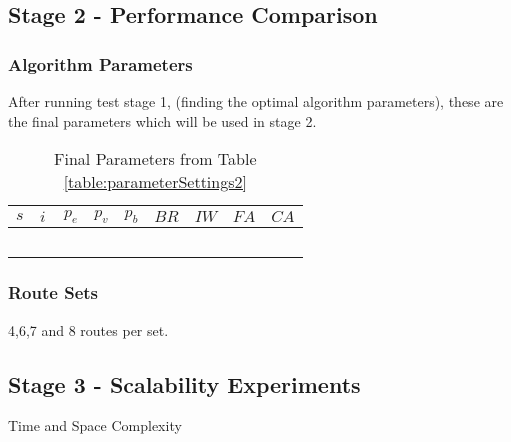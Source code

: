 \subsection{Stage 2 - Performance Comparison}

\subsubsection{Algorithm Parameters}
After running test stage 1, (finding the optimal algorithm parameters), these are the final parameters which will be used in stage 2.

\begin{table}[H]
	\centering
    \begin{tabular}{|l|l|l|l|l|l|l|l|l|}
 	\hline
 	$s$ & $i$ & $p_{e}$ & $p_{v}$ & $p_{b}$ & $BR$  & $IW$ & $FA$ & $CA$  \\
 	\hline
    ~ & ~ & ~ & ~ & ~ & ~ & ~ & ~  & ~  \\
	\hline
    \end{tabular}
    \caption {Final Parameters from Table \ref{table:parameterSettings2}}
    \label{table:finalParameters}
	\end{table}

\subsubsection{Route Sets}
4,6,7 and 8 routes per set.

\subsection{Stage 3 -  Scalability Experiments}
Time and Space Complexity
